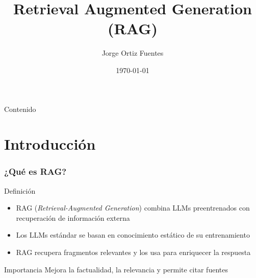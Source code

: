 \documentclass[handout]{beamer}
\title{Retrieval Augmented Generation (RAG)}
\author{Jorge Ortiz Fuentes}
\date{\today}
\begin{document}
\begin{frame}[plain]
  \titlepage
\end{frame}

\begin{frame}{Contenido}
  \tableofcontents[hideallsubsections] %
\end{frame}

\section{Introducción}

\begin{frame}
  \frametitle{¿Qué es RAG?}
  \begin{block}{Definición}
    \begin{itemize}
      \item RAG (\textit{Retrieval-Augmented Generation}) combina LLMs preentrenados con recuperación de información externa
      \item Los LLMs estándar se basan en conocimiento estático de su entrenamiento
      \item RAG recupera fragmentos relevantes y los usa para enriquecer la respuesta \parencite{Lewis2020RAG}
    \end{itemize}
  \end{block}
  \begin{alertblock}{Importancia}
      Mejora la factualidad, la relevancia y permite citar fuentes
  \end{alertblock}
\end{frame}
\end{document}
